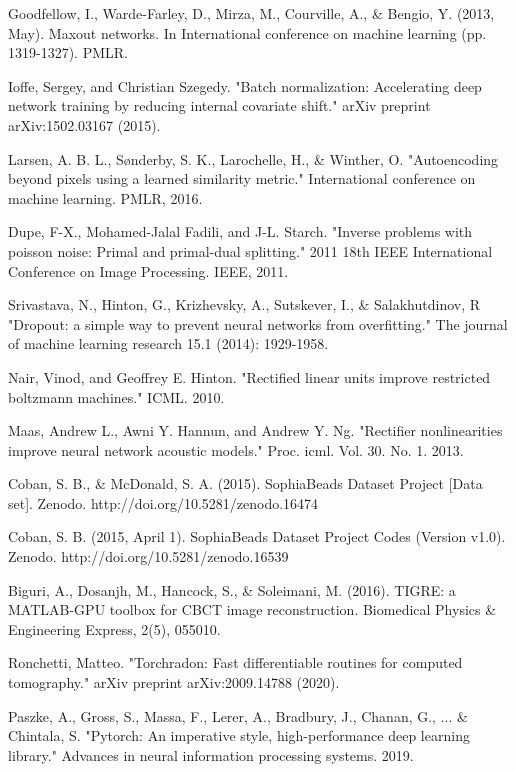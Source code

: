 \begin{thebibliography}{00}
Goodfellow, I., Warde-Farley, D., Mirza, M., Courville, A., \& Bengio, Y. (2013, May). Maxout networks. In International conference on machine learning (pp. 1319-1327). PMLR.

Ioffe, Sergey, and Christian Szegedy. "Batch normalization: Accelerating deep network training by reducing internal covariate shift." arXiv preprint arXiv:1502.03167 (2015).

Larsen, A. B. L., Sønderby, S. K., Larochelle, H., \& Winther, O. "Autoencoding beyond pixels using a learned similarity metric." International conference on machine learning. PMLR, 2016.

Dupe, F-X., Mohamed-Jalal Fadili, and J-L. Starch. "Inverse problems with poisson noise: Primal and primal-dual splitting." 2011 18th IEEE International Conference on Image Processing. IEEE, 2011.

 Srivastava, N., Hinton, G., Krizhevsky, A., Sutskever, I., \& Salakhutdinov, R "Dropout: a simple way to prevent neural networks from overfitting." The journal of machine learning research 15.1 (2014): 1929-1958.

Nair, Vinod, and Geoffrey E. Hinton. "Rectified linear units improve restricted boltzmann machines." ICML. 2010.

Maas, Andrew L., Awni Y. Hannun, and Andrew Y. Ng. "Rectifier nonlinearities improve neural network acoustic models." Proc. icml. Vol. 30. No. 1. 2013.

Coban, S. B., \& McDonald, S. A. (2015). SophiaBeads Dataset Project [Data set]. Zenodo. http://doi.org/10.5281/zenodo.16474

Coban, S. B. (2015, April 1). SophiaBeads Dataset Project Codes (Version v1.0). Zenodo. http://doi.org/10.5281/zenodo.16539

 Biguri, A., Dosanjh, M., Hancock, S., \& Soleimani, M. (2016). TIGRE: a MATLAB-GPU toolbox for CBCT image reconstruction. Biomedical Physics \& Engineering Express, 2(5), 055010.

Ronchetti, Matteo. "Torchradon: Fast differentiable routines for computed tomography." arXiv preprint arXiv:2009.14788 (2020).

 Paszke, A., Gross, S., Massa, F., Lerer, A., Bradbury, J., Chanan, G., ... \& Chintala, S. "Pytorch: An imperative style, high-performance deep learning library." Advances in neural information processing systems. 2019.


\end{thebibliography}
